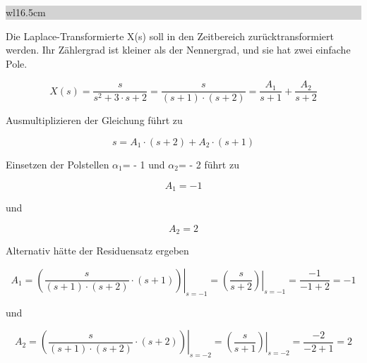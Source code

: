 \noindent
\colorbox{lightgray}{%
%
\renewcommand\arraystretch{0.6}%
\begin{tabular}{ wl{16.5cm} }
{ }
\end{tabular}%
}\bigskip

\noindent Die Laplace-Transformierte X(s) soll in den Zeitbereich zurücktransformiert werden. Ihr Zählergrad ist kleiner als der Nennergrad, und sie hat zwei einfache Pole. 

\begin{equation}\label{eq:fourhundredstwentyone}
X\left(s\right)=\frac{s}{s^{2} +3\cdot s+2} =\frac{s}{\left(s+1\right)\cdot \left(s+2\right)} =\frac{A_{1} }{s+1} +\frac{A_{2} }{s+2} 
\end{equation}

\noindent Ausmultiplizieren der Gleichung führt zu

\begin{equation}\label{eq:fourhundredstwentytwo}
s=A_{1} \cdot \left(s+2\right)+A_{2} \cdot \left(s+1\right)
\end{equation}

\noindent Einsetzen der Polstellen $\alpha_{1}$= - 1 und $\alpha_{2}$= - 2 führt zu 

\begin{equation}\label{eq:fourhundredstwentythree}
A_{1} =-1
\end{equation}

\noindent und

\begin{equation}\label{eq:fourhundredstwentyfour}
A_{2} =2
\end{equation}

\noindent Alternativ hätte der Residuensatz ergeben

\begin{equation}\label{eq:fourhundredstwentyfive}
A_{1} =\left. \left(\frac{s}{\left(s+1\right)\cdot \left(s+2\right)} \cdot \left(s+1\right)\right)\right|_{s=-1} =\left. \left(\frac{s}{s+2} \right)\right|_{s=-1} =\frac{-1}{-1+2} =-1
\end{equation}

\noindent und

\begin{equation}\label{eq:fourhundredstwentysix}
A_{2} =\left. \left(\frac{s}{\left(s+1\right)\cdot \left(s+2\right)} \cdot \left(s+2\right)\right)\right|_{s=-2} =\left. \left(\frac{s}{s+1} \right)\right|_{s=-2} =\frac{-2}{-2+1} =2
\end{equation}

